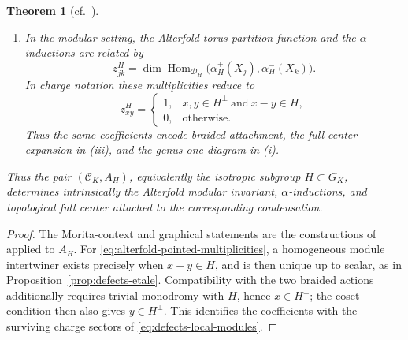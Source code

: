 \documentclass[12pt]{amsart}
\numberwithin{equation}{section}
\newtheorem{theorem}{Theorem}[section]
\theoremstyle{definition}
\DeclareMathOperator{\Hom}{Hom}
\begin{document}
\begin{theorem}[cf.~\cite{Alterfold1,Alterfold2}]
\begin{enumerate}
$${{{\begin{tikzpicture}[xscale=0.8, yscale=0.6]
\draw [blue, ->-=0.5] (-0.2,2.8)--(-0.2,0) node [left, pos=0.6] {\tiny $X_j$};
\draw [blue, -<-=0.5] (0.2,2.8)--(0.2,0) node [right, pos=0.6] {\tiny $X_k$};
\draw (-0.6,3)--(-0.6,0) (0.6,3)--(0.6,0);
\draw [blue] (-0.2,-3.2)--(-0.2,0) (0.2,-3.2)--(0.2,0);
\draw (-0.6,-3)--(-0.6,0) (0.6,-3)--(0.6,0);
\begin{scope}[shift={(0,-3)}]
\draw [dashed](0,0) [partial ellipse=0:180:0.6 and 0.3];
\draw (0,0) [partial ellipse=180:360:0.6 and 0.3];
\end{scope}
\draw [red, dashed](0,0) [partial ellipse=0:180:0.6 and 0.3];
\draw [white, line width=4pt] (0,0) [partial ellipse=220:270:0.6 and 0.3];
\draw [red] (0,0) [partial ellipse=180:280:0.6 and 0.3];
\draw [red] (0,0) [partial ellipse=300:360:0.6 and 0.3];
\end{tikzpicture}}}}.
$$\\

\item[(iv)] In the modular setting, the Alterfold torus partition function and the
$\alpha$-inductions are related by
$$
z^H_{jk}
=
\dim\Hom_{\mathcal D_H}\!\bigl(\alpha_H^+(X_j),\alpha_H^-(X_k)\bigr).
$$
In charge notation these multiplicities reduce to
\begin{equation}
\label{eq:alterfold-pointed-multiplicities}
z^H_{xy}=
\begin{cases}
1,&x,y\in H^\perp\ \text{and}\ x-y\in H,\\
0,&\text{otherwise}.
\end{cases}
\end{equation}
Thus the same coefficients encode braided attachment, the full-center
expansion in \textup{(iii)}, and the genus-one diagram in \textup{(i)}.
\end{enumerate}

Thus the pair $(\mathcal C_K,A_H)$, equivalently the isotropic subgroup
$H\subset G_K$, determines intrinsically the Alterfold modular invariant,
$\alpha$-inductions, and topological full center attached to the corresponding
condensation.
\end{theorem}

\begin{proof}
The Morita-context and graphical statements are the constructions of
\cite{Alterfold1,Alterfold2} applied to $A_H$. For
\eqref{eq:alterfold-pointed-multiplicities}, a homogeneous module
intertwiner exists precisely when $x-y\in H$, and is then unique up
to scalar, as in Proposition~\ref{prop:defects-etale}. Compatibility
with the two braided actions additionally requires trivial monodromy
with $H$, hence $x\in H^\perp$; the coset condition then also gives
$y\in H^\perp$. This identifies the coefficients with the surviving
charge sectors of \eqref{eq:defects-local-modules}.
\end{proof}
\end{document}

